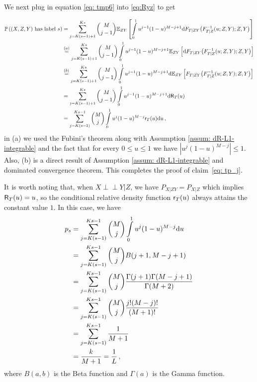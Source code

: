 \documentclass[11pt]{article}
\newcommand{\indep}{\perp \!\!\! \perp}
\begin{document}
We next plug in equation \eqref{eq: tmp6} into \eqref{eq:Ryz} to get

\begin{align}
	{\mathbb P}\left((X,Z,Y)\text{ has label } s \right)&=
	\sum\limits_{j=K(s-1)+1}^{Ks}\binom{M}{j-1}{\mathbb E}_{ZY}
	\left[ \int\limits_{0}^{1} u^{j-1}(1-u)^{M-j+1}{\rm d} F_{T|ZY}\big(F_{T|Z}^{-1}(u;Z,Y);Z,Y\big)       \right]\nonumber\\
	&\overset{(a)}{=}	\sum\limits_{j=K(s-1)+1}^{Ks}\binom{M}{j-1} \int\limits_{0}^{1} u^{j-1}(1-u)^{M-j+1}{\mathbb E}_{ZY}
	\left[{\rm d} F_{T|ZY}\big(F_{T|Z}^{-1}(u;Z,Y);Z,Y\big) \right]\nonumber\\
	&\overset{{(b)}}{=} \sum\limits_{j=K(s-1)+1}^{Ks}\binom{M}{j-1} \int\limits_{0}^{1} u^{j-1}(1-u)^{M-j+1}{\rm d}{\mathbb E}_{ZY}
	\left[F_{T|ZY}\big(F_{T|Z}^{-1}(u;Z,Y);Z,Y\big) \right]\nonumber\\
	&=\sum\limits_{j=K(s-1)+1}^{Ks}\binom{M}{j-1} \int\limits_{0}^{1} u^{j-1}(1-u)^{M-j+1}{\rm d} \mathsf{R}_{T}(u)\nonumber\\
	&=\sum\limits_{j=K(s-1)}^{Ks-1}\binom{M}{j} \int\limits_{0}^{1} u^{j}(1-u)^{M-j} \mathsf{r}_T(u){\rm d} u\label{eq: tmp7}\,,
\end{align}
in (a) we used the Fubini's theorem along with Assumption \ref{assum: dR-L1-integrable} and the fact that for every $0\leq u\leq 1 $ we have $|u^{j}(1-u)^{M-j}|\leq 1$.  Also, (b) is a direct result of Assumption \ref{assum: dR-L1-integrable} and dominated convergence theorem. This completes the proof of claim~\eqref{eq: tp_j}.

It is worth noting that, when $X\indep Y|Z$, we have $P_{X|ZY}=P_{X|Z}$ which implies $\mathsf{R}_{T}(u)=u$, so the conditional relative density function $\mathsf{r}_{T}(u)$ always attains the constant value $1$. In this case, we have 
\begin{align}
	p_{s}&= \sum\limits_{j=K(s-1)}^{Ks-1}\binom{M}{j} \int\limits_{0}^{1} u^{j}(1-u)^{M-j}{\rm d} u\nonumber\\
	&=\sum\limits_{j=K(s-1)}^{Ks-1}\binom{M}{j} B(j+1,M-j+1)\nonumber\\
	&=\sum\limits_{j=K(s-1)}^{Ks-1}\binom{M}{j} \frac{\Gamma(j+1)\Gamma(M-j+1)}{\Gamma(M+2)}\nonumber\\
	&=\sum\limits_{j=K(s-1)}^{Ks-1}\binom{M}{j} \frac{j!(M-j)!}{(M+1)!}\nonumber\\
	&=\sum\limits_{j=K(s-1)}^{Ks-1}\frac{1}{M+1}\nonumber\\
	&=\frac{k}{M+1}=\frac{1}{L}\label{eq: tmp8}\,,
\end{align}	
where $B(a,b)$ is the Beta function and $\Gamma(a)$ is the Gamma function. 
\end{document}
